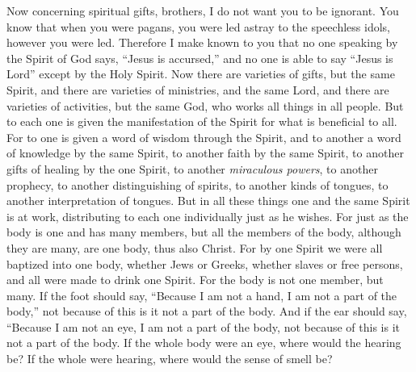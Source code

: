 \begin{biblechapter} %
 Now concerning spiritual gifts, brothers, I do not want you to be ignorant.
\verse You know that when you were pagans, you were led astray to the speechless idols, however you were led.
\verse Therefore I make known to you that no one speaking by the Spirit of God says, “Jesus is accursed,” and no one is able to say “Jesus is Lord” except by the Holy Spirit.
\verse Now there are varieties of gifts, but the same Spirit,
\verse and there are varieties of ministries, and the same Lord,
\verse and there are varieties of activities, but the same God, who works all things in all people.
\verse But to each one is given the manifestation of the Spirit for what is beneficial to all.
\verse For to one is given a word of wisdom through the Spirit, and to another a word of knowledge by the same Spirit,
\verse to another faith by the same Spirit, to another gifts of healing by the one Spirit,
\verse to another \textit{miraculous powers}, to another prophecy, to another distinguishing of spirits, to another kinds of tongues, to another interpretation of tongues.
\verse But in all these things one and the same Spirit is at work, distributing to each one individually just as he wishes.
 For just as the body is one and has many members, but all the members of the body, although they are many, are one body, thus also Christ.
\verse For by one Spirit we were all baptized into one body, whether Jews or Greeks, whether slaves or free persons, and all were made to drink one Spirit.
\verse For the body is not one member, but many.
\verse If the foot should say, “Because I am not a hand, I am not a part of the body,” not because of this is it not a part of the body.
\verse And if the ear should say, “Because I am not an eye, I am not a part of the body, not because of this is it not a part of the body.
\verse If the whole body were an eye, where would the hearing be? If the whole were hearing, where would the sense of smell be?

\end{biblechapter}
